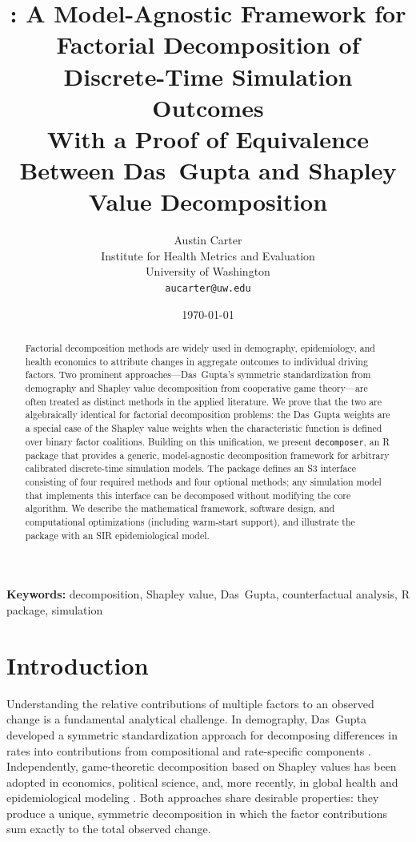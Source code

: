 \documentclass[11pt]{article}
\title{%
  \pkg{decomposer}: A Model-Agnostic Framework for Factorial Decomposition
  of Discrete-Time Simulation Outcomes \\[0.5em]
  \large With a Proof of Equivalence Between Das~Gupta and
  Shapley Value Decomposition}
\author{
  Austin Carter \\
  Institute for Health Metrics and Evaluation \\
  University of Washington \\
  \texttt{aucarter@uw.edu}
}
\date{\today}
\newcommand{\pkg}[1]{\texttt{#1}}
\newcommand{\R}{\textsf{R}}
\begin{document}
\maketitle

\begin{abstract}
Factorial decomposition methods are widely used in demography,
epidemiology, and health economics to attribute changes in aggregate
outcomes to individual driving factors.
Two prominent approaches---Das~Gupta's symmetric standardization from
demography and Shapley value decomposition from cooperative game
theory---are often treated as distinct methods in the applied literature.
We prove that the two are algebraically identical for factorial
decomposition problems: the Das~Gupta weights are a special case of the
Shapley value weights when the characteristic function is defined over
binary factor coalitions.
Building on this unification, we present \pkg{decomposer}, an \R{}
package that provides a generic, model-agnostic decomposition framework
for arbitrary calibrated discrete-time simulation models.
The package defines an S3 interface consisting of four required methods
and four optional methods; any simulation model that implements this
interface can be decomposed without modifying the core algorithm.
We describe the mathematical framework, software design, and
computational optimizations (including warm-start support), and
illustrate the package with an SIR epidemiological model.
\end{abstract}

\bigskip
\noindent\textbf{Keywords:} decomposition, Shapley value, Das~Gupta,
counterfactual analysis, R package, simulation


\section{Introduction}
\label{sec:introduction}

Understanding the relative contributions of multiple factors to an
observed change is a fundamental analytical challenge.
In demography, Das~Gupta developed a symmetric standardization approach
for decomposing differences in rates into contributions from
compositional and rate-specific components
\citep{dasgupta1993standardization}.
Independently, game-theoretic decomposition based on Shapley values
\citep{shapley1953value} has been adopted in economics, political
science, and, more recently, in global health and epidemiological
modeling \citep{carter2024pediatric, shorrocks2013decomposition}.
Both approaches share desirable properties: they produce a unique,
symmetric decomposition in which the factor contributions sum exactly to
the total observed change.
\end{document}
